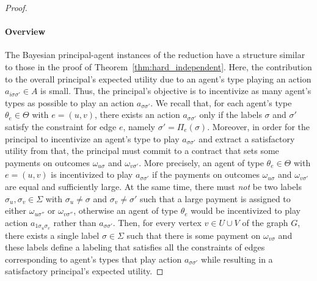 \begin{proof}
	\paragraph{Overview}
	The Bayesian principal-agent instances of the reduction have a structure similar to those in the proof of Theorem~\ref{thm:hard_independent}.
	Here, the contribution to the overall principal's expected utility due to an agent's type playing an action $a_{i \sigma \sigma'} \in A$ is small.
	Thus, the principal's objective is to incentivize as many agent's types as possible to play an action $a_{\sigma\sigma'}$.
	We recall that, for each agent's type $\theta_{e} \in \Theta$ with $e = (u,v)$, there exists an action $a_{\sigma \sigma'}$ only if the labels $\sigma$ and $\sigma'$ satisfy the constraint for edge $e$, namely $\sigma' = \Pi_e(\sigma)$.
	Moreover, in order for the principal to incentivize an agent's type to play $a_{\sigma \sigma'}$ and extract a satisfactory utility from that, the principal must commit to a contract that sets some payments on outcomes $\omega_{u \sigma}$ and $\omega_{v \sigma'}$.
	More precisely, an agent of type $\theta_{e} \in \Theta$ with $e = (u,v)$ is incentivized to play $a_{\sigma \sigma'}$ if the payments on outcomes $\omega_{u \sigma}$ and $\omega_{v \sigma'}$ are equal and sufficiently large.
	At the same time, there must \emph{not} be two labels $\sigma_u, \sigma_v \in \Sigma$ with $\sigma_u \neq \sigma$ and $\sigma_v \neq \sigma'$ such that a large payment is assigned to either $\omega_{u \sigma''}$ or $\omega_{v \sigma''}$, otherwise an agent of type $\theta_e$ would be incentivized to play action $a_{1 \sigma_u \sigma_v}$ rather than $a_{\sigma \sigma'}$.
	Then, for every vertex $v \in U \cup V$ of the graph $G$, there exists a single label $\sigma \in \Sigma$ such that there is some payment on $\omega_{v \sigma}$ and these labels define a labeling that satisfies all the constraints of edges corresponding to agent's types that play action $a_{\sigma \sigma'}$ while resulting in a satisfactory principal's expected utility.


\end{proof}
